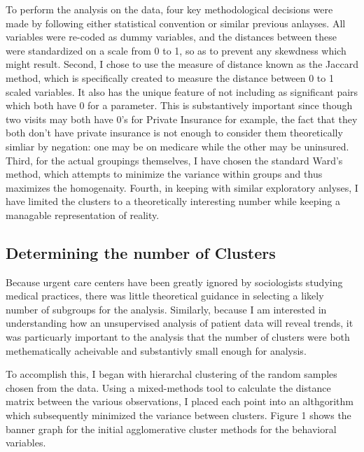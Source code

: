 \documentclass[12pt,twoside]{reedthesis}
\begin{document}
  To perform the analysis on the data, four key methodological decisions
  were made by following either statistical convention or similar previous
  anlayses. All variables were re-coded as dummy variables, and the
  distances between these were standardized on a scale from 0 to 1, so as
  to prevent any skewdness which might result. Second, I chose to use the
  measure of distance known as the Jaccard method, which is specifically
  created to measure the distance between 0 to 1 scaled variables. It also
  has the unique feature of not including as significant pairs which both
  have 0 for a parameter. This is substantively important since though two
  visits may both have 0's for Private Insurance for example, the fact
  that they both don't have private insurance is not enough to consider
  them theoretically simliar by negation: one may be on medicare while the
  other may be uninsured. Third, for the actual groupings themselves, I
  have chosen the standard Ward's method, which attempts to minimize the
  variance within groups and thus maximizes the homogenaity. Fourth, in
  keeping with similar exploratory anlyses, I have limited the clusters to
  a theoretically interesting number while keeping a managable
  representation of reality.
  
  \subsection*{Determining the number of
  Clusters}\label{determining-the-number-of-clusters}
  
  Because urgent care centers have been greatly ignored by sociologists
  studying medical practices, there was little theoretical guidance in
  selecting a likely number of subgroups for the analysis. Similarly,
  because I am interested in understanding how an unsupervised analysis of
  patient data will reveal trends, it was particuarly important to the
  analysis that the number of clusters were both methematically acheivable
  and substantivly small enough for analysis.
  
  To accomplish this, I began with hierarchal clustering of the random
  samples chosen from the data. Using a mixed-methods tool to calculate
  the distance matrix between the various observations, I placed each
  point into an althgorithm which subsequently minimized the variance
  between clusters. Figure 1 shows the banner graph for the initial
  agglomerative cluster methods for the behavioral variables.
  
\end{document}
